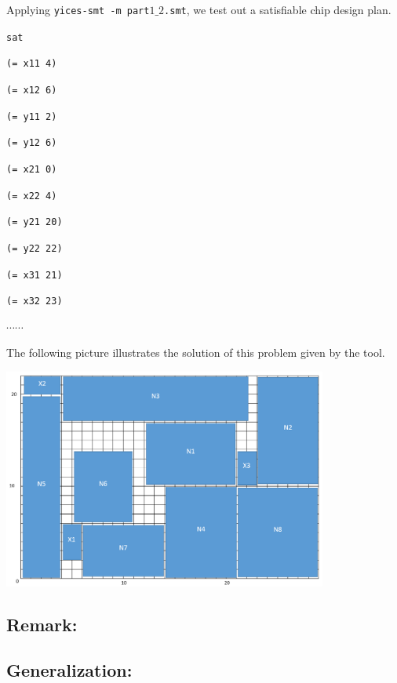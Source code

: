 Applying {\tt yices-smt -m part$1\_2$.smt}, we test out a satisfiable chip design plan.

{\footnotesize

{\tt sat}

{\tt(= x11 4)}

{\tt(= x12 6)}

{\tt(= y11 2)}

{\tt(= y12 6)}

{\tt(= x21 0)}

{\tt(= x22 4)}

{\tt(= y21 20)}

{\tt(= y22 22)}

{\tt(= x31 21)}

{\tt(= x32 23)}

$\cdots \cdots$

}

The following picture illustrates the solution of this problem given by the tool.

\begin{center}
\includegraphics[width=0.8\textwidth]{Part1_2_3.png}
\end{center}

\subsection*{Remark:}

\subsection*{Generalization:}